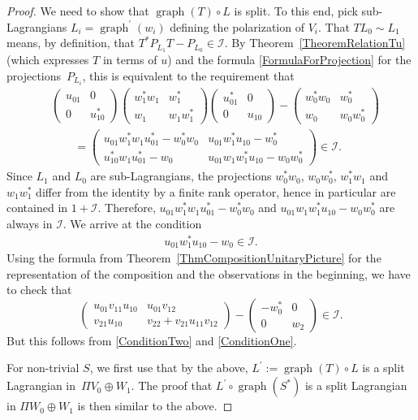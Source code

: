 \documentclass[pdftex]{sigma}
\numberwithin{equation}{section}
\DeclareMathOperator{\graph}{\mathrm{graph}}
\begin{document}
\begin{proof}
We need to show that $\graph(T) \circ L$ is split.
To this end, pick sub-Lagrangians $L_i = \graph^\prime(w_i)$ defining the polarization of $V_i$.
That $T L_0 \sim L_1$ means, by definition, that $T^*P_{L_1}T - P_{L_0} \in \mathcal{I}$.
By Theorem~\ref{TheoremRelationTu} (which expresses $T$ in terms of $u$) and the formula \eqref{FormulaForProjection} for the projections~$P_{L_i}$, this is equivalent to the requirement that
\begin{align*}
 &\begin{pmatrix} u_{01} & 0 \\ 0 & u_{10}^* \end{pmatrix}
 \begin{pmatrix}w_1^* w_1 & w_1^* \\ w_1 & w_1 w_1^* \end{pmatrix}
 \begin{pmatrix} u_{01}^* & 0 \\ 0 & u_{10} \end{pmatrix}
 -
 \begin{pmatrix}w_0^*w_0 & w_0^* \\ w_0 & w_0 w_0^* \end{pmatrix} \\
 &\qquad=
 \begin{pmatrix} u_{01} w_1^* w_1 u_{01}^* - w_0^* w_0 & u_{01}w_1^*u_{10} - w_0^* \\ u_{10}^*w_1 u_{01}^* - w_0& u_{01} w_1 w_1^* u_{10} - w_0 w_0^* \end{pmatrix} \in \mathcal{I}.
\end{align*}
Since $L_1$ and $L_0$ are sub-Lagrangians, the projections $w_0^* w_0$, $w_0 w_0^*$, $w_1^*w_1$ and $w_1 w_1^*$ differ from the identity by a finite rank operator, hence in particular are contained in $1 + \mathcal{I}$.
Therefore, ${u_{01} w_1^* w_1 u_{01}^* - w_0^* w_0}$ and $u_{01} w_1 w_1^* u_{10} - w_0 w_0^*$ are always in $\mathcal{I}$.
We arrive at the condition
\begin{gather} \label{ConditionOne}
u_{01}w_1^* u_{10} - w_0 \in \mathcal{I}.
\end{gather}
Using the formula from Theorem~\ref{ThmCompositionUnitaryPicture} for the representation of the composition and the observations in the beginning, we have to check that
\begin{equation*}
 \begin{pmatrix} u_{01} v_{11} u_{10} & u_{01} v_{12} \\
 v_{21} u_{10} & v_{22} + v_{21} u_{11}v_{12} \end{pmatrix}
 -
 \begin{pmatrix} -w_0^* & 0 \\
 0& w_2 \end{pmatrix} \in \mathcal{I}.
\end{equation*}
But this follows from \eqref{ConditionTwo} and \eqref{ConditionOne}.

For non-trivial $S$, we first use that by the above, $L^\prime := \graph(T) \circ L$ is a split Lagrangian in~${\Pi V_0 \oplus W_1}$.
The proof that $L^\prime \circ \graph(S^*)$ is a split Lagrangian in $\Pi W_0 \oplus W_1$ is then similar to the above.
\end{proof}
\end{document}
